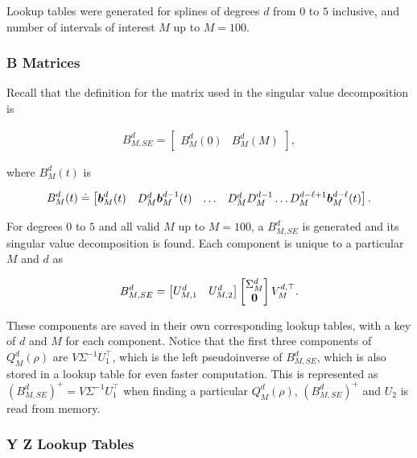 Lookup tables were generated for splines of degrees $d$ from $0$ to $5$ inclusive, and number of intervals of interest $M$ up to $M=100$.

\subsubsection{B Matrices}

Recall that the definition for the matrix used in the singular value decomposition is

\begin{align}
    B^d_{M,SE} =
    \begin{bmatrix} 
        B_M^d(0) & B_M^d(M) 
    \end{bmatrix},
\end{align}

where $B_M^d(t)$ is

\begin{align}
B_M^d(t) \doteq 
    \begin{bmatrix} 
        \boldsymbol{b}^d_M(t) & D_M^d \boldsymbol{b}^{d-1}_M(t) & \dots & D_M^d D_M^{d-1}\dots D_M^{d-\ell+1} \boldsymbol{b}^{d-\ell}_M(t)
 	\end{bmatrix}.
\end{align}

For degrees $0$ to $5$ and all valid $M$ up to $M=100$, a $B^d_{M,SE}$ is generated and its singular value decomposition is found. 
Each component is unique to a particular $M$ and $d$ as

\begin{align}
    B^d_{M,SE} =
    \begin{bmatrix}
        U^d_{M,1} & U^d_{M,2}
    \end{bmatrix}
    \begin{bmatrix}
        \Sigma^d_M \\ 
        \boldsymbol{0} 
    \end{bmatrix} 
    V^{d,\top}_M.
\end{align}

These components are saved in their own corresponding lookup tables, with a key of $d$ and $M$ for each component. 
Notice that the first three components of $Q_M^d(\rho)$ are $V \Sigma^{-1} U_1^\top$, which is the left pseudoinverse of $B^d_{M,SE}$, which is also stored in a lookup table for even faster computation. 
This is represented as $(B^d_{M,SE})^+ = V \Sigma^{-1} U_1^\top$ when finding a particular $Q_M^d(\rho)$, $(B^d_{M,SE})^+$ and $U_2$ is read from memory.

\subsubsection{Y Z Lookup Tables}

